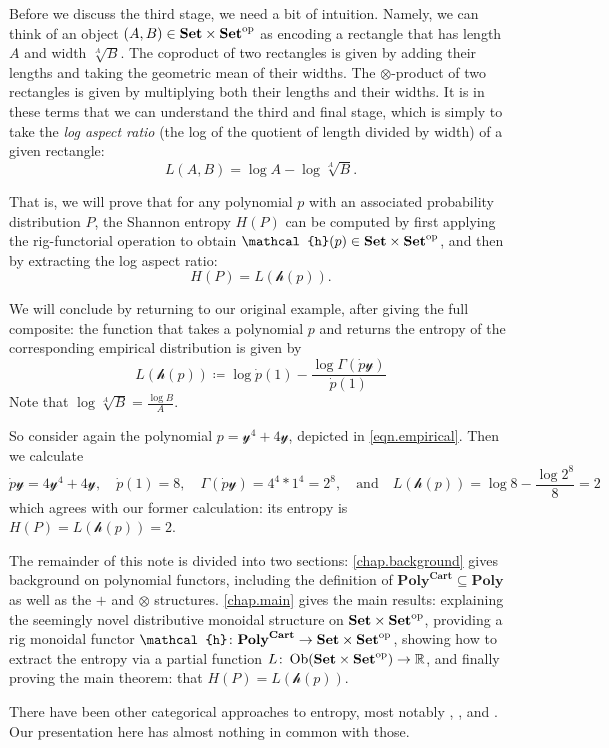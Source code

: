 \documentclass[11pt, one side, article]{memoir}
\theoremstyle{definition}
\theoremstyle{plain}
\renewcommand{\ss}{\subseteq}
\DeclareMathOperator{\ob}{Ob}
\newcommand{\Cat}[1]{\mathbf{#1}}%
\newcommand{\op}{^\tn{op}}
\newcommand{\tn}[1]{\textnormal{#1}}
\newcommand{\rr}{\mathbb{R}}
\newcommand{\smset}{\Cat{Set}}
\newcommand{\yon}{\mathcal{y}}
\newcommand{\poly}{\Cat{Poly}}
\newcommand{\polycart}{\poly^{\Cat{Cart}}}
\newcommand{\hh}{\mathcal{h}}
\newcommand{\0}{\textsf{0}}
\newcommand{\1}{\tn{\textsf{1}}}
\newcommand{\qand}{\quad\text{and}\quad}
\begin{document}
Before we discuss the third stage, we need a bit of intuition. Namely, we can think of an object $(A,B)\in\smset\times\smset\op$ as encoding a rectangle that has length $A$ and width $\sqrt[A]{B}$. The coproduct of two rectangles is given by adding their lengths and taking the geometric mean of their widths. The $\otimes$-product of two rectangles is given by multiplying both their lengths and their widths. It is in these terms that we can understand the third and final stage, which is simply to take the \emph{log aspect ratio} (the log of the quotient of length divided by width) of a given rectangle:
\[L(A,B)=\log A-\log\sqrt[A]{B}.\]

That is, we will prove that for any polynomial $p$ with an associated probability distribution $P$, the Shannon entropy $H(P)$ can be computed by first applying the rig-functorial operation to obtain $\hh(p)\in\smset\times\smset\op$, and then by extracting the log aspect ratio:
\[
H(P)=L(\hh(p)).
\]

We will conclude by returning to our original example, after giving the full composite: the function that takes a polynomial $p$ and returns the entropy of the corresponding empirical distribution is given by
\[
  L(\hh(p))\coloneqq\log \dot{p}(1)-\frac{\log\Gamma(\dot{p}\yon)}{\dot{p}(1)}
\]
Note that $\log\sqrt[A]{B}=\frac{\log B}{A}$.

So consider again the polynomial $p=\yon^4+4\yon$, depicted in \eqref{eqn.empirical}. Then we calculate
\[
\dot{p}\yon=4\yon^4+4\yon
,\quad
\dot{p}(1)=8
,\quad
\Gamma(\dot{p}\yon)=4^4*1^4=2^8
,\qand 
L(\hh(p))=\log 8-\frac{\log 2^8}{8}=2
\]
which agrees with our former calculation: its entropy is $H(P)=L(\hh(p))=2$. 

The remainder of this note is divided into two sections: \cref{chap.background} gives background on polynomial functors, including the definition of $\polycart\ss\poly$ as well as the $+$ and $\otimes$ structures. \cref{chap.main} gives the main results: explaining the seemingly novel distributive monoidal structure on $\smset\times\smset\op$, providing a rig monoidal functor $\hh\colon\polycart\to\smset\times\smset\op$, showing how to extract the entropy via a partial function $L\colon\ob(\smset\times\smset\op)\to\rr$, and finally proving the main theorem: that $H(P)=L(\hh(p))$.

There have been other categorical approaches to entropy, most notably \cite{baez2011characterization}, \cite{baez2014bayesian}, and \cite{leinster2021entropy}. Our presentation here has almost nothing in common with those. 
\end{document}
